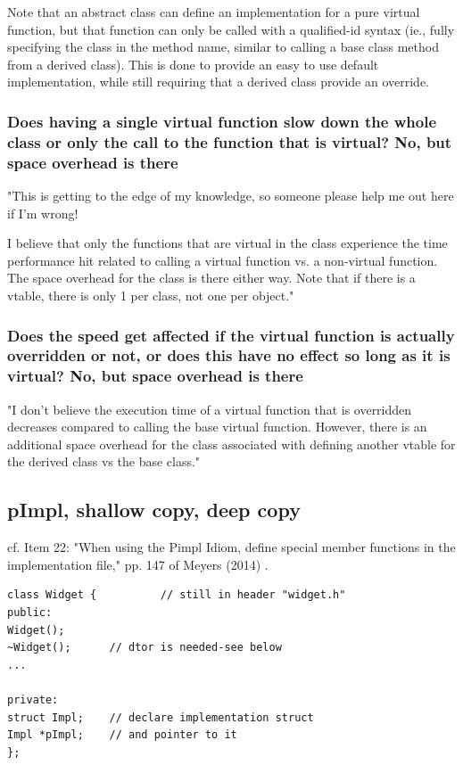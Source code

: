 \documentclass[10pt]{amsart}
\begin{document}
Note that an abstract class can define an implementation for a pure virtual function, but that function can only be called with a qualified-id syntax (ie., fully specifying the class in the method name, similar to calling a base class method from a derived class). This is done to provide an easy to use default implementation, while still requiring that a derived class provide an override.

\subsubsection{Does having a single virtual function slow down the whole class or only the call to the function that is virtual?  No, but space overhead is there}  

"This is getting to the edge of my knowledge, so someone please help me out here if I'm wrong!

I believe that only the functions that are virtual in the class experience the time performance hit related to calling a virtual function vs. a non-virtual function. The space overhead for the class is there either way. Note that if there is a vtable, there is only 1 per class, not one per object."

\subsubsection{Does the speed get affected if the virtual function is actually overridden or not, or does this have no effect so long as it is virtual?  No, but space overhead is there}  

"I don't believe the execution time of a virtual function that is overridden decreases compared to calling the base virtual function. However, there is an additional space overhead for the class associated with defining another vtable for the derived class vs the base class."  

\subsection{pImpl, shallow copy, deep copy}  

cf. Item 22: "When using the Pimpl Idiom, define special member functions in the implementation file," pp. 147 of Meyers (2014) \cite{ScMe2014}.  

\begin{lstlisting}
class Widget { 			// still in header "widget.h" 
public:
Widget();
~Widget();		// dtor is needed-see below 
... 

private:
struct Impl;	// declare implementation struct 
Impl *pImpl;	// and pointer to it
};
\end{lstlisting}
\end{document}
